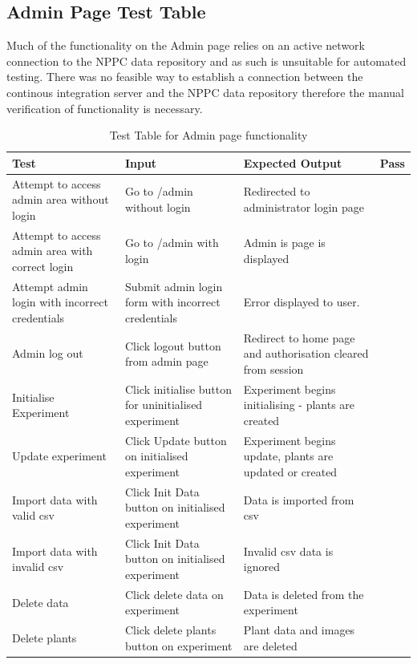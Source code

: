 \subsection{Admin Page Test Table}
Much of the functionality on the Admin page relies on an active network connection to the NPPC data repository and as such is unsuitable for automated testing. There was no feasible way to establish a connection between the continous integration server and the NPPC data repository therefore the manual verification of functionality is necessary.
\begin{table}[H]
\centering
\begin{tabular}{ | p{4cm} | p{4cm} |p{4cm} | p{1cm} | }
\hline
	\textbf{Test} & \textbf{Input} & \textbf{Expected Output} & \textbf{Pass} \\ \hline
	Attempt to access admin area without login & Go to /admin without login & Redirected to administrator login page & \checkmark \\ \hline
	Attempt to access admin area with correct login & Go to /admin with login & Admin is page is displayed & \checkmark \\ \hline
	Attempt admin login with incorrect credentials & Submit admin login form with incorrect credentials & Error displayed to user. & \checkmark \\ \hline
	Admin log out & Click logout button from admin page & Redirect to home page and authorisation cleared from session & \checkmark \\ \hline
	Initialise Experiment & Click initialise button for uninitialised experiment & Experiment begins initialising - plants are created & \checkmark \\ \hline
	Update experiment & Click Update button on initialised experiment & Experiment begins update, plants are updated or created & \checkmark \\ \hline
	Import data with valid csv & Click Init Data button on initialised experiment & Data is imported from csv & \checkmark \\ \hline
	Import data with invalid csv & Click Init Data button on initialised experiment & Invalid csv data is ignored & \checkmark \\ \hline
	Delete data & Click delete data on experiment & Data is deleted from the experiment & \checkmark \\ \hline
	Delete plants & Click delete plants button on experiment & Plant data and images are deleted & \checkmark \\ \hline
\end{tabular}
\caption{Test Table for Admin page functionality}
\label{test_table_admin}
\end{table}
